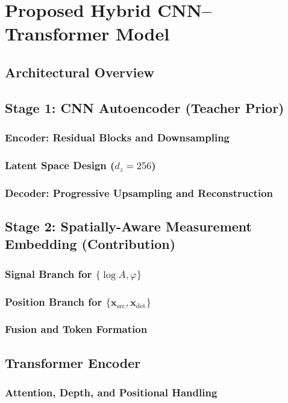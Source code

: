 \chapter{Proposed Hybrid CNN–Transformer Model}
\section{Architectural Overview}
\section{Stage 1: CNN Autoencoder (Teacher Prior)}
\subsection{Encoder: Residual Blocks and Downsampling}
\subsection{Latent Space Design ($d_z{=}256$)}
\subsection{Decoder: Progressive Upsampling and Reconstruction}
\section{Stage 2: Spatially-Aware Measurement Embedding (Contribution)}
\subsection{Signal Branch for $\{\log A,\varphi\}$}
\subsection{Position Branch for $\{\mathbf{x}_\mathrm{src},\mathbf{x}_\mathrm{det}\}$}
\subsection{Fusion and Token Formation}
\section{Transformer Encoder}
\subsection{Attention, Depth, and Positional Handling}
